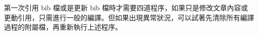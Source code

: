 第一次引用 bib 檔或是更新 bib 檔時才需要四道程序，如果只是修改文章內容或更動引用，只需進行一般的編譯。但如果出現異常狀況，可以試著先清除所有編譯過程的附屬檔，再重新執行上述程序。

%
%
%

%
%

%
%
